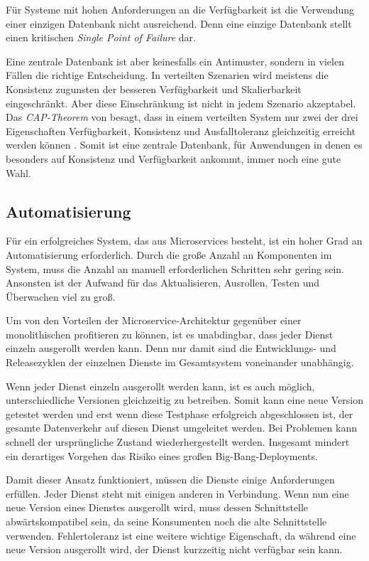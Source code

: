 Für Systeme mit hohen Anforderungen an die Verfügbarkeit ist die Verwendung einer einzigen Datenbank nicht ausreichend. Denn eine einzige Datenbank stellt einen kritischen \textit{Single Point of Failure} dar.

Eine zentrale Datenbank ist aber keinesfalls ein Antimuster, sondern in vielen Fällen die richtige Entscheidung. In verteilten Szenarien wird meistens die Konsistenz zugunsten der besseren Verfügbarkeit und Skalierbarkeit eingeschränkt. Aber diese Einschränkung ist nicht in jedem Szenario akzeptabel. Das \textit{CAP-Theorem} von \citeauthor{Brewer:2000:TRD:343477.343502} besagt, dass in einem verteilten System nur zwei der drei Eigenschaften Verfügbarkeit, Konsistenz und Ausfalltoleranz gleichzeitig erreicht werden können \cite{Brewer:2000:TRD:343477.343502}. Somit ist eine zentrale Datenbank, für Anwendungen in denen es besonders auf Konsistenz und Verfügbarkeit ankommt, immer noch eine gute Wahl.

\subsection{Automatisierung}

Für ein erfolgreiches System, das aus Microservices besteht, ist ein hoher Grad an Automatisierung erforderlich. Durch die große Anzahl an Komponenten im System, muss die Anzahl an manuell erforderlichen Schritten sehr gering sein. Ansonsten ist der Aufwand für das Aktualisieren, Ausrollen, Testen und Überwachen viel zu groß.

Um von den Vorteilen der Microservice-Architektur gegenüber einer monolithischen profitieren zu können, ist es unabdingbar, dass jeder Dienst einzeln ausgerollt werden kann. Denn nur damit sind die Entwicklungs- und Releasezyklen der einzelnen Dienste im Gesamtsystem voneinander unabhängig.

Wenn jeder Dienst einzeln ausgerollt werden kann, ist es auch möglich, unterschiedliche Versionen gleichzeitig zu betreiben. Somit kann eine neue Version getestet werden und erst wenn diese Testphase erfolgreich abgeschlossen ist, der gesamte Datenverkehr auf diesen Dienst umgeleitet werden. Bei Problemen kann schnell der ursprüngliche Zustand wiederhergestellt werden. Insgesamt mindert ein derartiges Vorgehen das Risiko eines großen Big-Bang-Deployments.

Damit dieser Ansatz funktioniert, müssen die Dienste einige Anforderungen erfüllen. Jeder Dienst steht mit einigen anderen in Verbindung. Wenn nun eine neue Version eines Dienstes ausgerollt wird, muss dessen Schnittstelle abwärtskompatibel sein, da seine Konsumenten noch die alte Schnittstelle verwenden. Fehlertoleranz ist eine weitere wichtige Eigenschaft, da während eine neue Version ausgerollt wird, der Dienst kurzzeitig nicht verfügbar sein kann.

